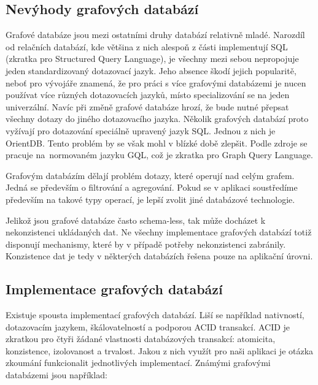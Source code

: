 \documentclass[
  program=infoi,
  biblatex=true,
  figures=true,
  glossaries=false,
  index,
  sourcecodes=true
]{kidiplom}
\begin{document}
\subsection{Nevýhody grafových databází}
Grafové databáze jsou mezi ostatními druhy databází relativně mladé. Narozdíl od relačních databází, kde většina z nich alespoň z části implementují SQL (zkratka pro Structured Query Language), je všechny mezi sebou nepropojuje jeden standardizovaný dotazovací jazyk. Jeho absence škodí jejich popularitě, neboť pro vývojáře znamená, že pro práci s více grafovými databázemi je nucen používat více různých dotazovacích jazyků, místo specializování se na jeden univerzální. Navíc při změně grafové databáze hrozí, že bude nutné přepsat všechny dotazy do jiného dotazovacího jazyka. Několik grafových databází proto vyžívají pro dotazování speciálně upravený jazyk SQL. Jednou z nich je OrientDB. Tento problém by se však mohl v blízké době zlepšit. Podle zdroje \cite{GQL} se pracuje na~normovaném jazyku GQL, což je zkratka pro Graph Query Language.

Grafovým databázím dělají problém dotazy, které operují nad celým grafem. Jedná se především o filtrování a agregování. Pokud se v aplikaci soustředíme především na takové typy operací, je lepší zvolit jiné databázové technologie.

Jelikož jsou grafové databáze často schema-less, tak může docházet k nekonzistenci ukládaných dat. Ne všechny implementace grafových databází totiž disponují mechanismy, které by v případě potřeby nekonzistenci zabránily. Konzistence dat je tedy v některých databázích řešena pouze na aplikační úrovni.

\subsection{Implementace grafových databází}
Existuje spousta implementací grafových databází. Liší se například nativností, dotazovacím jazykem, škálovatelností a podporou ACID transakcí. ACID je zkratkou pro čtyři žádané vlastnosti databázových transakcí: atomicita, konzistence, izolovanost a trvalost. Jakou z nich využít pro naši aplikaci je otázka zkoumání funkcionalit jednotlivých implementací. Známými grafovými databázemi jsou například:
\end{document}
